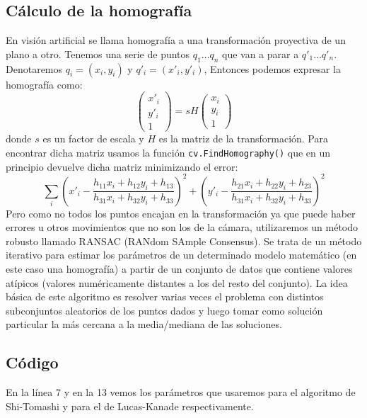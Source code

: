 \documentclass[a4paper,openright, 12pt]{book}
\begin{document}
\subsection{Cálculo de la homografía}
En visión artificial se llama homografía a una transformación proyectiva de un plano a otro.
\newline
Tenemos una serie de puntos $q_1 \ldots q_n$ que van a parar a $q'_1 \ldots q'_n$. Denotaremos $q_i = (x_i,y_i)$ y $q'_i=(x'_i, y'_i)$,
Entonces podemos expresar la homografía como:
\begin{equation}
	\left( \begin{array}{c}
	x'_i\\
	y'_i\\
	1
	\end{array} \right)
	= sH
		\left( \begin{array}{c}
	x_i\\
	y_i\\
	1
	\end{array} \right)
\end{equation}
donde $s$ es un factor de escala y $H$ es la matriz de la transformación.
Para encontrar dicha matriz usamos la función \lstinline|cv.FindHomography()|
que en un principio devuelve dicha matriz minimizando el error:
\begin{equation*}
\sum_i \left( x'_i - \dfrac{h_{11}x_i + h_{12}y_i + h_{13}}{h_{31}x_i + h_{32}y_i + h_{33}} \right) ^2  
+ 
\left( y'_i - \dfrac{h_{21}x_i + h_{22}y_i + h_{23}}{h_{31}x_i + h_{32}y_i + h_{33}} \right) ^2 
\end{equation*}
Pero como no todos los puntos encajan en la transformación ya que puede haber errores u otros movimientos que no son los de la cámara, utilizaremos un método robusto llamado RANSAC (RANdom SAmple Consensus). Se trata de un método iterativo para estimar los parámetros de un determinado modelo matemático (en este caso una homografía) a partir de un conjunto de datos que contiene valores atípicos (valores numéricamente distantes a los del resto del conjunto). La idea básica de este algoritmo es resolver varias veces el problema con distintos subconjuntos aleatorios de los puntos dados y luego tomar como solución particular la más cercana a la media/mediana de las soluciones.
\newpage
\subsection{Código}

En la línea 7 y en la 13 vemos los parámetros que usaremos para el algoritmo de Shi-Tomashi y para el de Lucas-Kanade respectivamente.
\end{document}
